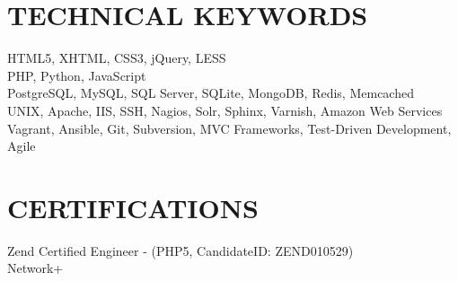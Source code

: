 \documentclass{res}
\begin{document}
\begin{resume}
\section{TECHNICAL KEYWORDS}  

    HTML5, XHTML, CSS3, jQuery, LESS \\
    PHP, Python, JavaScript \\
    PostgreSQL, MySQL, SQL Server, SQLite, MongoDB, Redis, Memcached \\
    UNIX, Apache, IIS, SSH, Nagios, Solr, Sphinx, Varnish, Amazon Web Services \\
    Vagrant, Ansible, Git, Subversion, MVC Frameworks, Test-Driven Development, Agile

 
\section{CERTIFICATIONS}
    Zend Certified Engineer - (PHP5, CandidateID: ZEND010529) \\
    Network+
 
\end{resume}
\end{document}
